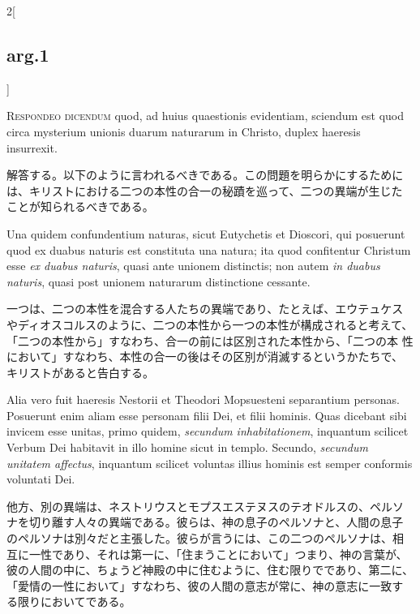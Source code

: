 \documentclass[paper=a4paper,fontsize=10pt,jafontsize=9pt,titlepage]{jlreq}
\begin{document}
\begin{paracol}{2}[\subsection{arg.1}]

{\scshape Respondeo dicendum} quod, ad huius quaestionis evidentiam,
sciendum est quod circa mysterium unionis duarum naturarum in Christo,
duplex haeresis insurrexit.

\switchcolumn

解答する。以下のように言われるべきである。この問題を明らかにするために
は、キリストにおける二つの本性の合一の秘蹟を巡って、二つの異端が生じた
ことが知られるべきである。

\switchcolumn*

Una quidem confundentium naturas, sicut Eutychetis et Dioscori, qui
posuerunt quod ex duabus naturis est constituta una natura; ita quod
confitentur Christum esse {\itshape ex duabus naturis}, quasi ante
unionem distinctis; non autem {\itshape in duabus naturis}, quasi post
unionem naturarum distinctione cessante.

\switchcolumn

一つは、二つの本性を混合する人たちの異端であり、たとえば、エウテュケス
やディオスコルスのように、二つの本性から一つの本性が構成されると考えて、
「二つの本性から」すなわち、合一の前には区別された本性から、「二つの本
性において」すなわち、本性の合一の後はその区別が消滅するというかたちで、
キリストがあると告白する。

\switchcolumn*

Alia vero fuit haeresis Nestorii et Theodori Mopsuesteni separantium
personas. Posuerunt enim aliam esse personam filii Dei, et filii
hominis. Quas dicebant sibi invicem esse unitas, primo quidem,
{\itshape secundum inhabitationem}, inquantum scilicet Verbum Dei
habitavit in illo homine sicut in templo. Secundo, {\itshape secundum
unitatem affectus}, inquantum scilicet voluntas illius hominis est
semper conformis voluntati Dei.

\switchcolumn

他方、別の異端は、ネストリウスとモプスエステヌスのテオドルスの、ペルソ
ナを切り離す人々の異端である。彼らは、神の息子のペルソナと、人間の息子
のペルソナは別々だと主張した。彼らが言うには、この二つのペルソナは、相
互に一性であり、それは第一に、「住まうことにおいて」つまり、神の言葉が、
彼の人間の中に、ちょうど神殿の中に住むように、住む限りでであり、第二に、
「愛情の一性において」すなわち、彼の人間の意志が常に、神の意志に一致す
る限りにおいてである。


\end{paracol}
\end{document}
